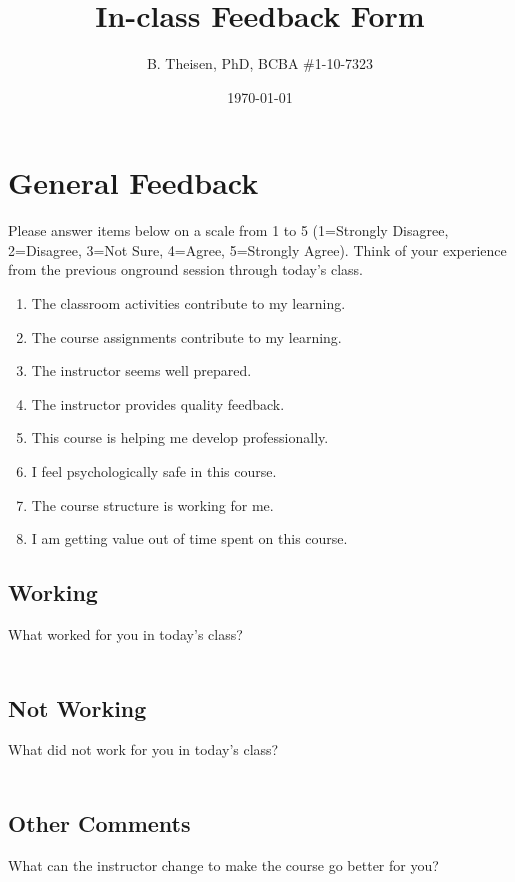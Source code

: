 \documentclass[12pt]{article}
\begin{document}
\title{In-class Feedback Form}
\date{\today}
\author{B. Theisen, PhD, BCBA \#1-10-7323}

\maketitle
\section{General Feedback}
Please answer items below on a scale from 1 to 5 
(1=Strongly Disagree, 2=Disagree, 3=Not Sure, 4=Agree, 5=Strongly Agree).
Think of your experience from the previous onground session through today's class.
\begin{enumerate}
\item The classroom activities contribute to my learning. 
\item The course assignments contribute to my learning.
\item The instructor seems well prepared.
\item The instructor provides quality feedback.
\item This course is helping me develop professionally.
\item I feel psychologically safe in this course.
\item The course structure is working for me.
\item I am getting value out of time spent on this course.
\end{enumerate}

  \subsection{Working}
  What worked for you in today's class?
  \\
  \\
  \subsection{Not Working}
  What did not work for you in today's class?
  \\
  \\
  \subsection{Other Comments}
  What can the instructor change to make the course go better for you? 
\end{document}
